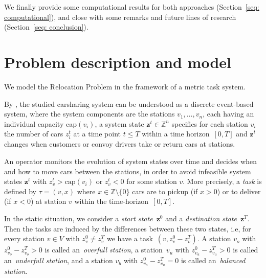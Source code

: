 \documentclass[english]{llncs}
\numberwithin{sublemma}{lemma}
\newcommand{\ZZ}{\ensuremath{\mathbb{Z}}}
\newcommand{\capacity}{\ensuremath{\text{cap}}}
\newcommand{\z}{\boldsymbol{z}}
\begin{document}
We finally provide some computational results for both approaches (Section~\ref{seq: computational}), and close with some remarks and future lines of research (Section~\ref{seq: conclusion}).






\section{Problem description and model}
\label{sec: model}


We model the Relocation Problem in the framework of a metric task system. 

By \cite{LAGOS2013}, the studied carsharing system can be understood as a discrete event-based system, where
the system components are the stations $v_1, \ldots, v_n$, each having an individual capacity cap$(v_i)$,
a system state $\z^t \in \ZZ^n$ specifies for each station $v_i$ the number of cars $z^t_i$ at a time point $t \leq T$ within a time horizon~$[0, T]$ 
and $\z^t$ changes when customers or convoy drivers take or return cars at stations. 


An operator monitors the evolution of system states over time and decides when and how to move cars
between the stations,
in order to avoid infeasible system states $\z^t$ with $z^t_v > \capacity(v_i)$ or $z^t_v < 0$ for some station $v$.
More precisely, a \emph{task} is defined by $\tau = (v, x)$ where $x \in \ZZ \setminus \{0\}$ cars are to pickup (if $x > 0$) or to deliver (if $x < 0$) at station $v$ within the time-horizon~$[0, T]$. 


In the static situation, we consider a \emph{start state}~$\z^0$ and a \emph{destination state}~$\z^T$.
Then the tasks are induced by the differences between these two states, i.e, for every station $v \in V$ with $z^0_v \neq z^T_v$ we have a task~$(v, z^0_v - z^T_v)$.
A station $v_o$ with $z^0_{v_o} - z^T_{v_o} > 0$ is called an~\emph{overfull station}, a station~$v_u$ with $z^0_{v_u} - z^T_{v_u} > 0$ is called an~\emph{underfull station},
and a station $v_b$ with $z^0_{v_o} - z^T_{v_u} = 0$ is called an~\emph{balanced station}.
\end{document}
